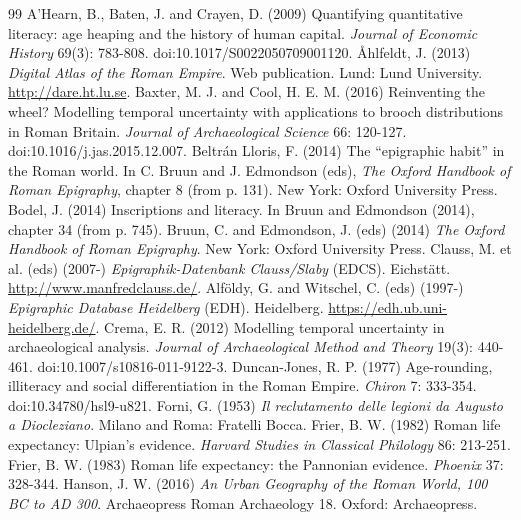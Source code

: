 \begin{thebibliography}{99}
 A'Hearn, B., Baten, J. and Crayen, D. (2009) Quantifying quantitative literacy: age heaping and the history of human capital. \textit{Journal of Economic History} 69(3): 783-808. doi:10.1017/S0022050709001120.
 {\AA}hlfeldt, J. (2013) \textit{Digital Atlas of the Roman Empire}. Web publication. Lund: Lund University. \url{http://dare.ht.lu.se}.
 Baxter, M. J. and Cool, H. E. M. (2016) Reinventing the wheel? Modelling temporal uncertainty with applications to brooch distributions in Roman Britain. \textit{Journal of Archaeological Science} 66: 120-127. doi:10.1016/j.jas.2015.12.007.
 Beltr{\'a}n Lloris, F. (2014) The ``epigraphic habit'' in the Roman world. In C. Bruun and J. Edmondson (eds), \textit{The Oxford Handbook of Roman Epigraphy}, chapter 8 (from p. 131). New York: Oxford University Press.
 Bodel, J. (2014) Inscriptions and literacy. In Bruun and Edmondson (2014), chapter 34 (from p. 745).
 Bruun, C. and Edmondson, J. (eds) (2014) \textit{The Oxford Handbook of Roman Epigraphy}. New York: Oxford University Press.
 Clauss, M. et al. (eds) (2007-) \textit{Epigraphik-Datenbank Clauss/Slaby} (EDCS). Eichst{\"a}tt. \url{http://www.manfredclauss.de/}.
 Alf{\"o}ldy, G. and Witschel, C. (eds) (1997-) \textit{Epigraphic Database Heidelberg} (EDH). Heidelberg. \url{https://edh.ub.uni-heidelberg.de/}.
 Crema, E. R. (2012) Modelling temporal uncertainty in archaeological analysis. \textit{Journal of Archaeological Method and Theory} 19(3): 440-461. doi:10.1007/s10816-011-9122-3.
 Duncan-Jones, R. P. (1977) Age-rounding, illiteracy and social differentiation in the Roman Empire. \textit{Chiron} 7: 333-354. doi:10.34780/hsl9-u821.
 Forni, G. (1953) \textit{Il reclutamento delle legioni da Augusto a Diocleziano}. Milano and Roma: Fratelli Bocca.
 Frier, B. W. (1982) Roman life expectancy: Ulpian's evidence. \textit{Harvard Studies in Classical Philology} 86: 213-251.
 Frier, B. W. (1983) Roman life expectancy: the Pannonian evidence. \textit{Phoenix} 37: 328-344.
 Hanson, J. W. (2016) \textit{An Urban Geography of the Roman World, 100 BC to AD 300}. Archaeopress Roman Archaeology 18. Oxford: Archaeopress.

\end{thebibliography}

